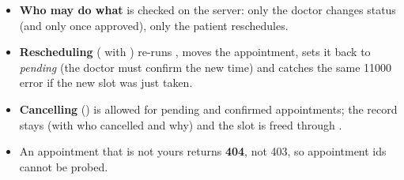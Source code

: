 \begin{itemize}
  \item \textbf{Who may do what} is checked on the server: only the doctor
    changes status (and only once approved), only the patient reschedules.
  \item \textbf{Rescheduling} ( with ) re-runs
    , moves the appointment, sets it back to \emph{pending}
    (the doctor must confirm the new time) and catches the same 11000 error if
    the new slot was just taken.
  \item \textbf{Cancelling} () is allowed for pending and confirmed
    appointments; the record stays (with who cancelled and why) and the slot is
    freed through .
  \item An appointment that is not yours returns \textbf{404}, not 403, so
    appointment ids cannot be probed.
\end{itemize}
